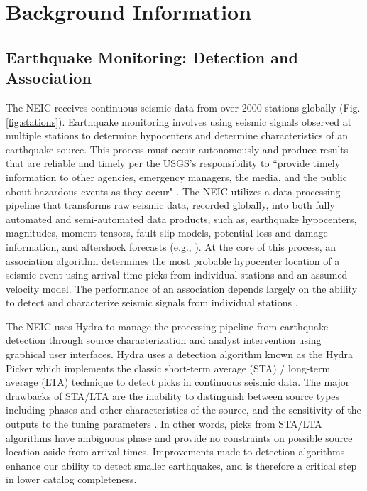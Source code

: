 \documentclass[12p]{article}
\begin{document}
\section{Background Information}
\subsection{Earthquake Monitoring: Detection and Association}

The NEIC receives continuous seismic data from over 2000 stations globally (Fig. \ref{fig:stations}). Earthquake
monitoring involves using seismic signals observed at multiple stations to determine hypocenters and determine
characteristics of an earthquake source. This process must occur autonomously and produce results that are reliable and
timely per the USGS's responsibility to ``provide timely information to other agencies, emergency managers, the media,
and the public about hazardous events as they occur" \citep{Holmes2013}. The NEIC
utilizes a data processing pipeline that transforms raw seismic data, recorded globally, into both fully
automated and semi-automated data products, such as, earthquake hypocenters, magnitudes, moment
tensors, fault slip models, potential loss and damage information, and aftershock forecasts (e.g., \citet{Thompson2019, Michael2019}). At the core of this process, an association algorithm determines the most probable hypocenter
location of a seismic event using arrival time picks from individual stations and an assumed velocity
model. The performance of an association depends largely on the ability to detect and characterize
seismic signals from individual stations \citep{Yeck2019}.

The NEIC uses Hydra \citep{Patton2016} to manage the processing pipeline from earthquake detection through source
characterization and analyst intervention using graphical user interfaces. Hydra uses a detection algorithm known as
the Hydra Picker which implements the classic short-term average (STA) / long-term average (LTA) \citep{Lee1981}
technique to detect picks in continuous seismic data. The major drawbacks of STA/LTA are the inability to distinguish
between source types including phases and other characteristics of the source, and the sensitivity of the outputs to
the tuning parameters \citep{Patton2016}. In other words, picks from STA/LTA algorithms have ambiguous phase and
provide no constraints on possible source location aside from arrival times. Improvements made to detection algorithms
enhance our ability to detect smaller earthquakes, and is therefore a critical step in lower catalog completeness.
\end{document}
